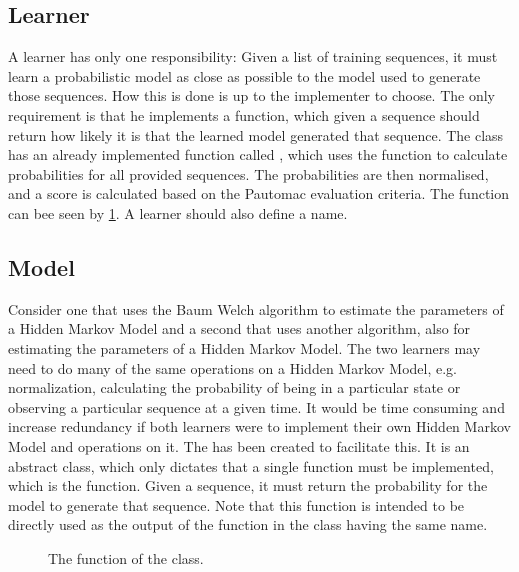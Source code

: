 \subsection{Learner}
A learner has only one responsibility: Given a list of training sequences, it must learn a probabilistic model as close as possible to the model used to generate those sequences. How this is done is up to the implementer to choose. The only requirement is that he implements a  function, which given a sequence should return how likely it is that the learned model generated that sequence.
The  class has an already implemented function called , which uses the  function to calculate probabilities for all provided sequences.
The probabilities are then normalised, and a score is calculated based on the Pautomac evaluation criteria.
The  function can bee seen by \ref{code:learner}.
A learner should also define a name.

\subsection{Model}
Consider one  that uses the Baum Welch algorithm to estimate the parameters of a Hidden Markov Model and a second  that uses another algorithm, also for estimating the parameters of a Hidden Markov Model. The two learners may need to do many of the same operations on a Hidden Markov Model, e.g. normalization, calculating the probability of being in a particular state or observing a particular sequence at a given time. 
It would be time consuming and increase redundancy if both learners were to implement their own Hidden Markov Model and operations on it.
The  has been created to facilitate this. It is an abstract class, which only dictates that a single function must be implemented, which is the  function. Given a sequence, it must return the probability for the model to generate that sequence. Note that this function is intended to be directly used as the output of the function in the  class having the same name.

\begin{figure}
\caption{The  function of the  class.}
\label{code:learner}
\end{figure}

